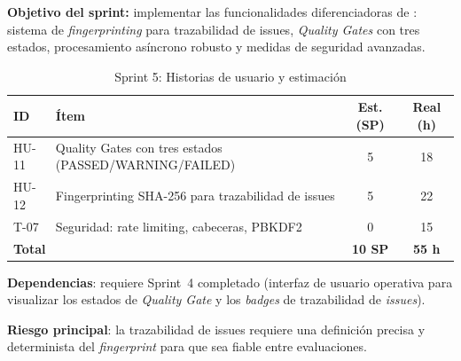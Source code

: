 \textbf{Objetivo del sprint:} implementar las funcionalidades diferenciadoras
de \dataqual: sistema de \emph{fingerprinting} para trazabilidad de issues,
\emph{Quality Gates} con tres estados, procesamiento asíncrono robusto y
medidas de seguridad avanzadas.

\begin{table}[htbp]
  \centering
  \small
  \caption{Sprint 5: Historias de usuario y estimación}
  \label{tab:sprint5-hu}
  \begin{tabularx}{\textwidth}{l X c c}
    \toprule
    \textbf{ID} & \textbf{Ítem} & \textbf{Est. (SP)} & \textbf{Real (h)} \\
    \midrule
    HU-11 & Quality Gates con tres estados (PASSED/WARNING/FAILED) & 5 & 18 \\
    HU-12 & Fingerprinting SHA-256 para trazabilidad de issues & 5 & 22 \\
    T-07  & Seguridad: rate limiting, cabeceras, PBKDF2 & 0 & 15 \\
    \midrule
    \multicolumn{2}{l}{\textbf{Total}} & \textbf{10 SP} & \textbf{55 h} \\
    \bottomrule
  \end{tabularx}
\end{table}

\textbf{Dependencias}: requiere Sprint~4 completado (interfaz de usuario
operativa para visualizar los estados de \emph{Quality Gate} y los
\emph{badges} de trazabilidad de \emph{issues}).

\textbf{Riesgo principal}: la trazabilidad de issues requiere una definición
precisa y determinista del \emph{fingerprint} para que sea fiable entre
evaluaciones.

